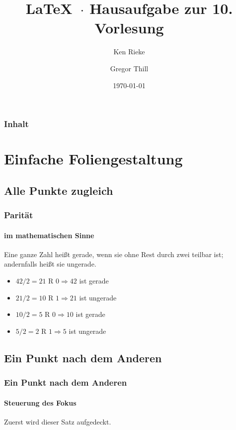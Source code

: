 \documentclass[ngerman]{beamer}
\title{\LaTeX\ $\cdot$ Hausaufgabe zur 10. Vorlesung}
\author{Ken Rieke \and Gregor Thill}
\institute{Technische Universität Carolo-Wilhelmina zu Braunschweig}
\date{\today}
\begin{document}
\frame{\titlepage}

\begin{frame}[label=inhalt]
  \frametitle{Inhalt}
  \tableofcontents[pausesections]
\end{frame}

\section{Einfache Foliengestaltung}
\subsection{Alle Punkte zugleich}
\begin{frame}[label=paritaet]
  \frametitle{Parität}
  \framesubtitle{im mathematischen Sinne}
  \begin{definition}
    Eine ganze Zahl heißt \alert{gerade}, wenn sie ohne Rest durch zwei teilbar
    ist; andernfalls heißt sie \alert{ungerade}.\cite{wikiped-1}
  \end{definition}
  \begin{example}
    \begin{itemize}
      \item $42 / 2 = 21$ R $0 \Rightarrow 42$ ist gerade
      \item $21 / 2 = 10$ R $1 \Rightarrow 21$ ist ungerade
      \item $10 / 2 = 5$ R $0 \Rightarrow 10$ ist gerade
      \item $5 / 2 = 2$ R $1 \Rightarrow 5$ ist ungerade
    \end{itemize}
  \end{example}
\end{frame}

\subsection{Ein Punkt nach dem Anderen}
\begin{frame}[label=reihe]
  \frametitle{Ein Punkt nach dem Anderen}
  \framesubtitle{Steuerung des Fokus}
  \begin{theorem}
    Zuerst wird dieser Satz aufgedeckt.
  \end{theorem}
\end{frame}
\end{document}
